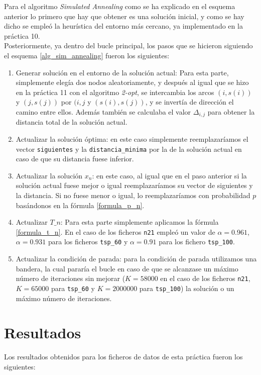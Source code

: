 \documentclass[a4paper,11pt]{article}
\begin{document}
Para el algoritmo \textit{Simulated Annealing} como se ha explicado en el esquema anterior lo primero que hay que obtener es una solución inicial, y como se hay dicho se empleó la heurística del entorno más cercano, ya implementado en la práctica 10.\\

Posteriormente, ya dentro del bucle principal, los pasos que se hicieron siguiendo el esquema \ref{alg_sim_annealing} fueron los siguientes:

\begin{enumerate}
\item Generar solución en el entorno de la solución actual: Para esta parte, simplemente elegía dos nodos aleatoriamente, y después al igual que se hizo en la práctica 11 con el algoritmo \textit{2-opt}, se intercambia los arcos ${(i,s(i))}$ y ${(j,s(j))}$ por ${(i,j}$ y ${(s(i),s(j))}$, y se invertía de dirección el camino entre ellos. Además también se calculaba el valor ${\Delta_{i,j}}$ para obtener la distancia total de la solución actual.
\item Actualizar la solución óptima: en este caso simplemente reemplazaríamos el vector \texttt{siguientes} y la \texttt{distancia\_minima} por la de la solución actual en caso de que su distancia fuese inferior.
\item Actualizar la solución ${x_{n}}$: en este caso, al igual que en el paso anterior si la solución actual fuese mejor o igual reemplazaríamos su vector de siguientes y la distancia. Si no fuese menor o igual, lo reemplazaríamos con probabilidad ${p}$ basándonos en la fórmula \ref{formula_p_n}.
\item Actualizar ${T\_{n}}$: Para esta parte simplemente aplicamos la fórmula \ref{formula_t_n}. En el caso de los ficheros \texttt{n21} empleó un valor de ${\alpha = 0.961}$, ${\alpha = 0.931}$ para los ficheros \texttt{tsp\_60} y ${\alpha = 0.91}$ para los fichero \texttt{tsp\_100}.
\item Actualizar la condición de parada: para la condición de parada utilizamos una bandera, la cual pararía el bucle en caso de que se alcanzase un máximo número de iteraciones sin mejorar (${K=58000}$ en el caso de los ficheros \texttt{n21}, ${K=65000}$ para \texttt{tsp\_60} y ${K=2000000}$ para \texttt{tsp\_100}) la solución o un máximo número de iteraciones.
\end{enumerate}

\newpage
\section{Resultados}
Los resultados obtenidos para los ficheros de datos de esta práctica fueron los siguientes:
\end{document}
